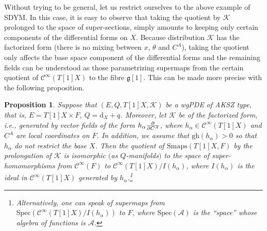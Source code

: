 \documentclass[10pt,a4paper]{amsart}
\numberwithin{equation}{section}
\newtheorem{Proposition}[Theorem]{Proposition}
\theoremstyle{definition}
\newcommand{\gh}[1]{\mathrm{gh}(#1)}
\newcommand{\dx}{\mathrm{d}_X}
\renewcommand{\d}{\partial}
\newcommand{\ffrac}[2]{\raisebox{.5pt}%
 {\footnotesize$\displaystyle\frac{#1}{#2}$}\kern1pt}
\newcommand{\dl}[1]{\mathchoice{\ffrac{\d}{\d #1}}{\frac{\d}{\d #1}}{\ffrac{\d}{\d #1}}{\ffrac{\d}{\d #1}}}
\newcommand{\Liealg}{\mathfrak}
\newcommand{\algg}{\Liealg{g}}
\newcommand{\algA}{\mathcal{A}}
\newcommand{\cC}{\mathcal{C}}
\def\cK{\mathcal{K}}
\begin{document}
Without trying to be general, let us restrict ourselves to the above example of SDYM. In this case, it is easy to observe that taking the quotient by $\cK$ prolonged to the space of super-sections, simply amounts to keeping only certain components of the differential forms on $X$. Because distribution $\cK$ has the factorized form \big(there is no mixing between $x$, $\theta$ and $C^A$\big), taking the quotient only affects the base space component of the differential forms and the remaining fields can be understood as those parametrizing supermaps from the certain quotient of $\cC^\infty(T[1]X)$ to the fibre $\algg[1]$. This can be made more precise with the following proposition.

\begin{Proposition}
Suppose that $(E,Q,T[1]X,\cK)$ be a wgPDE of AKSZ type, that is, $E=T[1]X\times F$, $Q=\dx+q$. Moreover, let $\cK$ be of the factorized form, i.e., generated by vector fields of the form
$h_\alpha\dl{C^A}$, where $h_\alpha\in \cC^\infty(T[1]X)$ and $C^A$ are local coordinates on $F$. In addition, we assume that $\gh{h_\alpha}>0$ so that $h_\alpha$ do not restrict the base $X$. Then the quotient of $\mathrm{Smaps}(T[1]X,F)$ by the prolongation of $\cK$ is isomorphic $($as $Q$-manifolds$)$ to the space of super-homomorphisms from $\cC^\infty(F)$ to $\cC^\infty(T[1]X)/I(h_\alpha)$, where $I(h_\alpha)$ is the ideal in
$\cC^\infty(T[1]X)$ generated by $h_\alpha$.\footnote{Alternatively,
one can speak of supermaps from $\mathrm{Spec}(\cC^\infty(T[1]X)/I(h_\alpha))$ to $F$, where $\mathrm{Spec}(\algA)$ is the ``space'' whose algebra of functions is $\algA$.}
\end{Proposition}
\end{document}

